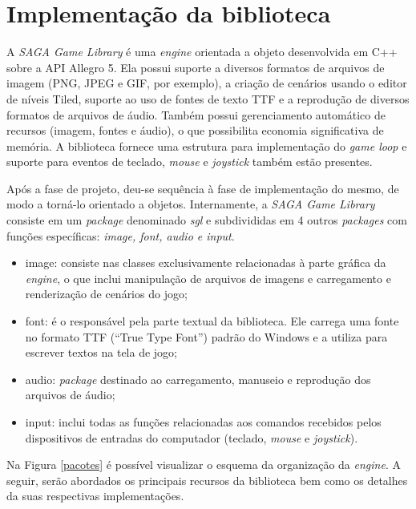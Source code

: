 \section{Implementação da biblioteca}
%
%
A \textit{SAGA Game Library} é uma \textit{engine} orientada a objeto desenvolvida em C++ sobre a API Allegro 5. Ela possui suporte a diversos formatos de arquivos de imagem (PNG, JPEG e GIF, por exemplo), a criação de cenários usando o editor de níveis Tiled, suporte ao uso de fontes de texto TTF e a reprodução de diversos formatos de arquivos de áudio. Também possui gerenciamento automático de recursos (imagem, fontes e áudio), o que possibilita economia significativa de memória. A biblioteca fornece uma estrutura para implementação do \textit{game loop} e suporte para eventos de teclado, \textit{mouse} e \textit{joystick} também estão presentes. 
\par 
Após a fase de projeto, deu-se sequência à fase de implementação do mesmo, de modo a torná-lo orientado a objetos. Internamente, a \textit{SAGA Game Library} consiste em um \textit{package} denominado \textit{sgl} e subdivididas em 4 outros \textit{packages} com funções específicas: \textit{image, font, audio e input}.
%
%
\begin{itemize}
 \item image: consiste nas classes exclusivamente relacionadas à parte gráfica da \textit{engine}, o que inclui manipulação de arquivos de imagens e carregamento e renderização de cenários do jogo;
 \item font: é o responsável pela parte textual da biblioteca. Ele carrega uma fonte no formato TTF (``True Type Font'') padrão do Windows e a utiliza para escrever textos na tela de jogo;
 \item audio: \textit{package} destinado ao carregamento, manuseio e reprodução dos arquivos de áudio;
 \item input: inclui todas as funções relacionadas aos comandos recebidos pelos dispositivos de entradas do computador (teclado, \textit{mouse} e \textit{joystick}).
\end{itemize}
%
Na Figura \ref{pacotes} é possível visualizar o esquema da organização da \textit{engine}. A seguir, serão abordados os principais recursos da biblioteca bem como os detalhes da suas respectivas implementações.
%
%
%
%
